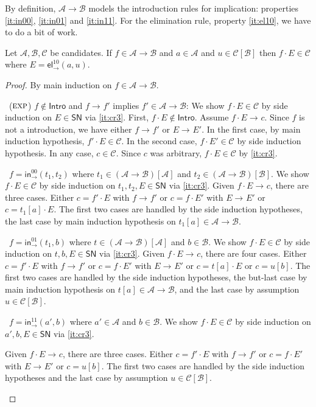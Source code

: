 \documentclass[a4paper,USenglish,cleveref, autoref, thm-restate]{lipics-v2019}
\newenvironment{caselist}{%
  \begin{list}{{\it Case}}{%
  }%
}{\end{list}%
}
\newcommand{\nextcase}{\item~}
\newcommand{\rulename}[1]{\ensuremath{\mbox{\textsc{#1}}}\xspace}
\newcommand{\rexp}{\rulename{exp}}
\newcommand{\tin}{\ensuremath{\mathsf{in}}}
\newcommand{\inn}[2]{\ensuremath{\tin_{#1}^{#2}}}
\newcommand{\tel}{\mathsf{el}}
\newcommand{\el}[2]{\ensuremath{\tel_{#1}^{#2}}}
\newcommand{\red}[1][]{\longrightarrow_{#1}}
\newcommand{\A}{\mathcal{A}}
\newcommand{\B}{\mathcal{B}}
\newcommand{\C}{\mathcal{C}}
\newcommand{\SN}{\mathsf{SN}}
\newcommand{\Intro}{\mathsf{Intro}}
\newcommand{\ind}[1]{}    %
\newcommand{\indp}[2]{#1} %
\begin{document}
By definition, $\A \to \B$ models the introduction rules for
implication:
properties \ref{it:in00}, \ref{it:in01} and \ref{it:in11}.
For the elimination rule, property \ref{it:el10}, we have to do a bit of work.
\begin{lemma}
  \label{lem:app}
  Let $\A,\B,\C$ be candidates.
  If $f \in \indp{\A \to \B}{\Gamma}$ and $a \in \A\ind\Gamma$ and
  $u \in \C[\B]\ind\Gamma$ then $f \cdot E \in \C$
  where $E = \el\to{10}(a,u)$.
\end{lemma}
\begin{proof}
  By main induction on $f \in \indp{\A \to \B}{\Gamma}$.
  \begin{caselist}

    \nextcase (\rexp) $f \not\in \Intro$ and $f \red f'$ implies
    $f' \in \indp{\A \to \B}{\Gamma}$:
    We show $f \cdot E \in \C$ by side induction on $E \in \SN$ via \ref{it:cr3}.
    First, $f \cdot E \not\in\Intro$.
    Assume $f \cdot E \red c$.  Since $f$ is not a introduction, we
    have either $f \red f'$ or $E \red E'$.  In the first case, by
    main induction hypothesis, $f' \cdot E \in \C$.
    In the second case, $f \cdot E' \in \C$ by side induction hypothesis.
    In any case, $c \in \C$.  Since $c$ was arbitrary, $f \cdot E \in
    \C$ by \ref{it:cr3}.

    \nextcase $f = \inn\to{00}(t_1,t_2)$ where
    $t_1 \in (\A \to \B)[\A]\ind\Gamma$ and
    $t_2 \in (\A \to \B)[\B]\ind\Gamma$.
    We show $f \cdot E \in \C$ by side induction on $t_1,t_2,E \in
    \SN$ via \ref{it:cr3}.
    Given $f \cdot E \red c$, there are three cases.  Either $c = f' \cdot
    E$ with $f \red f'$ or $c = f \cdot E'$ with $E \red E'$ or $c =
    t_1[a] \cdot E$.  The first two cases are handled by the side
    induction hypotheses, the last case by main induction hypothesis
    on $t_1[a] \in \indp{\A \to \B}{\Gamma}$.

    \nextcase $f = \inn\to{01}(t_1,b)$ where
    $t \in (\A \to \B)[\A]\ind\Gamma$ and
    $b \in \B\ind\Gamma$.
    We show $f \cdot E \in \C$ by side induction on $t,b,E \in
    \SN$ via \ref{it:cr3}.
    Given $f \cdot E \red c$, there are four cases.  Either $c = f' \cdot
    E$ with $f \red f'$ or $c = f \cdot E'$ with $E \red E'$ or $c =
    t[a] \cdot E$ or $c = u[b]$.  The first two cases are handled by the side
    induction hypotheses, the but-last case by main induction hypothesis
    on $t[a] \in \indp{\A \to \B}{\Gamma}$, and the last case by assumption
    $u \in \C[\B]\ind\Gamma$.

    \nextcase $f = \inn\to{11}(a',b)$ where
    $a' \in \A\ind\Gamma$ and
    $b \in \B\ind\Gamma$.
    We show $f \cdot E \in \C$ by side induction on $a',b,E \in
    \SN$ via \ref{it:cr3}.

    Given $f \cdot E \red c$, there are three cases.  Either
    $c = f' \cdot E$ with $f \red f'$ or $c = f \cdot E'$ with
    $E \red E'$ or $c = u[b]$.  The first two cases are handled by the
    side induction hypotheses and the last case by
    assumption $u \in \C[\B]\ind\Gamma$.
  \popQED
  \end{caselist}
\end{proof}
\end{document}
